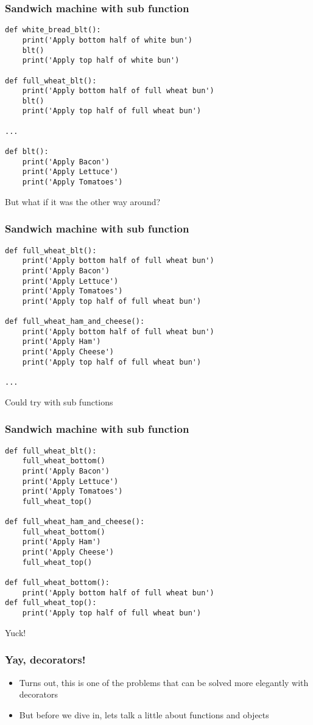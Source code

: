 \documentclass{beamer}
\begin{document}
\begin{frame}[fragile]
  \frametitle{Sandwich machine with sub function}
\begin{verbatim}
def white_bread_blt():
    print('Apply bottom half of white bun')
    blt()
    print('Apply top half of white bun')

def full_wheat_blt():
    print('Apply bottom half of full wheat bun')
    blt()
    print('Apply top half of full wheat bun')

...

def blt():
    print('Apply Bacon')
    print('Apply Lettuce')
    print('Apply Tomatoes')
\end{verbatim}
\pause
But what if it was the other way around?
\end{frame}

\begin{frame}[fragile]
  \frametitle{Sandwich machine with sub function}
\begin{verbatim}
def full_wheat_blt():
    print('Apply bottom half of full wheat bun')
    print('Apply Bacon')
    print('Apply Lettuce')
    print('Apply Tomatoes')
    print('Apply top half of full wheat bun')

def full_wheat_ham_and_cheese():
    print('Apply bottom half of full wheat bun')
    print('Apply Ham')
    print('Apply Cheese')
    print('Apply top half of full wheat bun')

...
\end{verbatim}
\pause
Could try with sub functions
\end{frame}

\begin{frame}[fragile]
  \frametitle{Sandwich machine with sub function}
\begin{verbatim}
def full_wheat_blt():
    full_wheat_bottom()
    print('Apply Bacon')
    print('Apply Lettuce')
    print('Apply Tomatoes')
    full_wheat_top()

def full_wheat_ham_and_cheese():
    full_wheat_bottom()
    print('Apply Ham')
    print('Apply Cheese')
    full_wheat_top()

def full_wheat_bottom():
    print('Apply bottom half of full wheat bun')
def full_wheat_top():
    print('Apply top half of full wheat bun')
\end{verbatim}
\pause
Yuck!
\end{frame}

\begin{frame}
  \frametitle{Yay, decorators!}
  \begin{itemize}
  \item Turns out, this is one of the problems that can be solved more
    elegantly with decorators
  \item But before we dive in, lets talk a little about functions and objects
  \end{itemize}
\end{frame}
\end{document}
